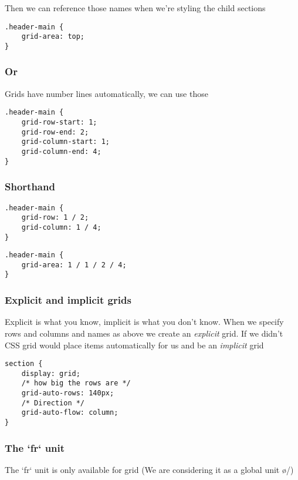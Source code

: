 Then we can reference those names when we're styling the child sections

\begin{verbatim}
.header-main {
    grid-area: top;
}
\end{verbatim}

\subsubsection{Or}

Grids have number lines automatically, we can use those

\begin{verbatim}
.header-main {
    grid-row-start: 1;
    grid-row-end: 2;
    grid-column-start: 1;
    grid-column-end: 4;
}
\end{verbatim}

\subsubsection{Shorthand}

\begin{verbatim}
.header-main {
    grid-row: 1 / 2;
    grid-column: 1 / 4;
}
\end{verbatim}

\begin{verbatim}
.header-main {
    grid-area: 1 / 1 / 2 / 4;
}
\end{verbatim}


\subsubsection{Explicit and implicit grids}

Explicit is what you know, implicit is what you don't know. When we specify rows and columns and names as above we create an \textit{explicit} grid. If we didn't CSS grid would place items automatically for us and be an \textit{implicit} grid


\begin{verbatim}
section {
    display: grid;
    /* how big the rows are */
    grid-auto-rows: 140px;
    /* Direction */
    grid-auto-flow: column;
}
\end{verbatim}


\subsubsection{The `fr` unit}

The `fr` unit is only available for grid
(We are considering it as a global unit \o/)

